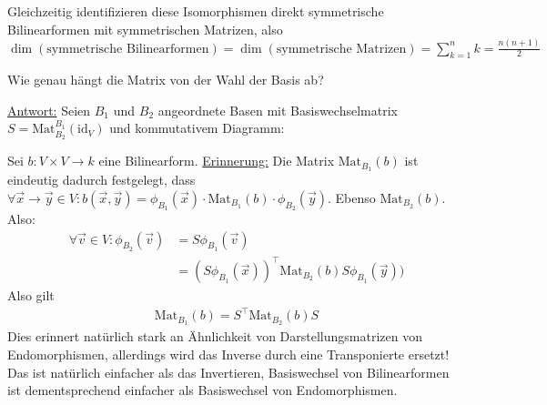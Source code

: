 \documentclass{report}
\newcommand*{\newpar}{\par\vspace{\baselineskip}\noindent}
\newcommand{\ul}[1]{\underline{#1}}
\newcommand{\vv}{\vec{v}}
\newcommand{\vx}{\vec{x}}
\newcommand{\vy}{\vec{y}}
\newcommand{\Mat}[3]{\text{Mat}^{#1}_{#2}\left(#3\right)}
\begin{document}
\begin{corollary}
 Gleichzeitig identifizieren diese Isomorphismen direkt symmetrische Bilinearformen mit symmetrischen Matrizen, also $\dim(\text{symmetrische Bilinearformen}) = \dim(\text{symmetrische Matrizen}) = \sum_{k=1}^n k = \frac{n(n+1)}{2}$
\end{corollary}
\begin{question}
 Wie genau hängt die Matrix von der Wahl der Basis ab?
\end{question}
\hspace{-14pt}\ul{Antwort:} Seien $B_1$ und $B_2$ angeordnete Basen mit Basiswechselmatrix $S = \Mat{B_1}{B_2}{\text{id}_V}$ und kommutativem Diagramm:
\begin{figure}[h!]
\centering
{}
\end{figure}
\newpar
Sei $b : V \times V \to k$ eine Bilinearform. \ul{Erinnerung:} Die Matrix $\Mat{}{B_1}{b}$ ist eindeutig dadurch festgelegt, dass $\forall \vx \to \vy \in V : b(\vx, \vy) = \phi_{B_1}(\vx) \cdot \Mat{}{B_1}{b} \cdot \phi_{B_2}(\vy)$. Ebenso $\Mat{}{B_2}{b}$. Also:
\begin{align*}
 \forall \vv \in V: \phi_{B_2}(\vv) &= S \phi_{B_1}(\vv)\\
 &= (S \phi_{B_1}(\vx))^\top \Mat{}{B_2}{b} S \phi_{B_1}(\vy))
\end{align*}
Also gilt 
\begin{align*}
 \Mat{}{B_1}{b} = S^\top \Mat{}{B_2}{b} S
\end{align*}
Dies erinnert natürlich stark an Ähnlichkeit von Darstellungsmatrizen von Endomorphismen, allerdings wird das Inverse durch eine Transponierte ersetzt! Das ist natürlich einfacher als das Invertieren, Basiswechsel von Bilinearformen ist dementsprechend einfacher als Basiswechsel von Endomorphismen.
%
%
%
%
%
%
%
%
%
%
%
%
%
%
%
%
%
%
%
%
%
\end{document}
